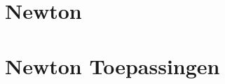 \documentclass{ximera}
\begin{document}
        \author{Bert Lambregs}

\section{Newton}





\section{Newton Toepassingen}






\end{document}
